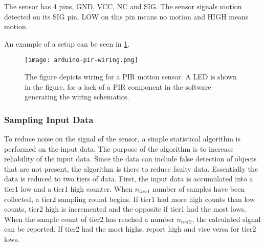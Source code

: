 The sensor has 4 pins, GND, VCC, NC and SIG. The sensor signals motion detected on its SIG pin. LOW on this pin means no motion and HIGH means motion.

An example of a setup can be seen in \cref{fig:arduino_pir_wiring}.

\begin{figure}[htbp]
  \centering
  \texttt{[image: arduino-pir-wiring.png]}
  \caption{The figure depicts wiring for a PIR motion sensor. A LED is shown in
    the figure, for a lack of a PIR component in the software generating the
    wiring schematics.}
  \label{fig:arduino_pir_wiring}
\end{figure}

\subsubsection{Sampling Input Data}

To reduce noise on the signal of the sensor, a simple statistical algorithm is
performed on the input data. The purpose of the algorithm is to increase reliability of the input data. Since the data can include false detection of objects that are not present, the algorithm is there to reduce  faulty data.  Essentially the data is reduced to two tiers
of data. First, the input data is accumulated into a tier1 low and a tier1 high
counter. When $n_{tier1}$ number of samples have been collected, a tier2 sampling round begins. If tier1
had more high counts than low counts, tier2 high is incremented and the opposite if
tier1 had the most lows. When the sample count of tier2 has reached a number
$n_{tier2}$, the calculated signal can be reported. If tier2 had the most highs,
report high and vice versa for tier2 lows.